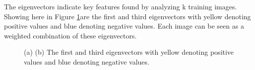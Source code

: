 \documentclass[UTF8,12pt]{article}
\begin{document}
	The eigenvectors indicate key features found by analyzing k training images. Showing here in Figure \ref{fig:eigens}are the first and third eigenvectors with yellow denoting positive values and blue denoting negative values. Each image can be seen as a weighted combination of these eigenvectors.
	\begin{figure}[!ht]
		\centering
		\caption{\label{fig:eigens}(a) (b) The first and third eigenvectors with yellow denoting positive values and blue denoting negative values.}
	\end{figure}
	
\end{document}
